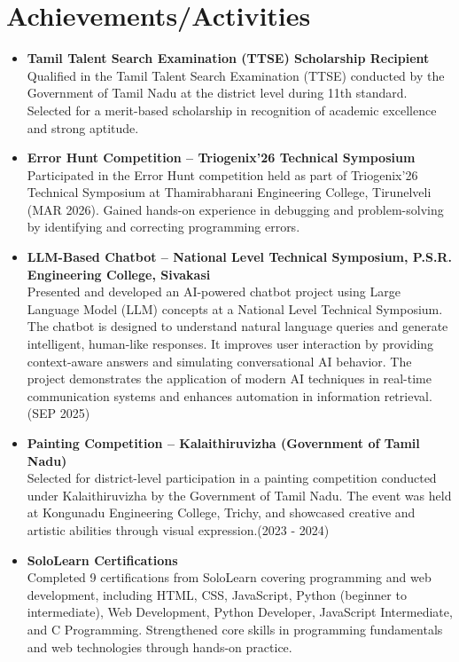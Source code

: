 \documentclass[letterpaper,11pt]{article}
\begin{document}
\section{Achievements/Activities}
\begin{itemize}[leftmargin=0.15in]

\item \textbf{Tamil Talent Search Examination (TTSE) Scholarship Recipient} \\
Qualified in the Tamil Talent Search Examination (TTSE) conducted by the Government of Tamil Nadu at the district level during 11th standard. Selected for a merit-based scholarship in recognition of academic excellence and strong aptitude.
\item \textbf{Error Hunt Competition – Triogenix'26 Technical Symposium} \\
Participated in the Error Hunt competition held as part of Triogenix'26 Technical Symposium at Thamirabharani Engineering College, Tirunelveli (MAR 2026). Gained hands-on experience in debugging and problem-solving by identifying and correcting programming errors.
\item \textbf{LLM-Based Chatbot – National Level Technical Symposium, P.S.R. Engineering College, Sivakasi} \\
Presented and developed an AI-powered chatbot project using Large Language Model (LLM) concepts at a National Level Technical Symposium. The chatbot is designed to understand natural language queries and generate intelligent, human-like responses. It improves user interaction by providing context-aware answers and simulating conversational AI behavior. The project demonstrates the application of modern AI techniques in real-time communication systems and enhances automation in information retrieval. (SEP 2025)
\item \textbf{Painting Competition – Kalaithiruvizha (Government of Tamil Nadu)} \\
Selected for district-level participation in a painting competition conducted under Kalaithiruvizha by the Government of Tamil Nadu. The event was held at Kongunadu Engineering College, Trichy, and showcased creative and artistic abilities through visual expression.(2023 - 2024)
\item \textbf{SoloLearn Certifications} \\
Completed 9 certifications from SoloLearn covering programming and web development, including HTML, CSS, JavaScript, Python (beginner to intermediate), Web Development, Python Developer, JavaScript Intermediate, and C Programming. Strengthened core skills in programming fundamentals and web technologies through hands-on practice.
\vspace{60pt}
\end{itemize}
\end{document}
